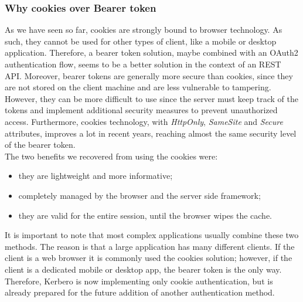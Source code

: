 \subsubsection{Why cookies over Bearer token}
As we have seen so far, cookies are strongly bound to browser technology. As such, they cannot be used for other types of client, like a mobile or desktop application. Therefore, a bearer token solution, maybe combined with an OAuth2 authentication flow, seems to be a better solution in the context of an REST API. 
Moreover, bearer tokens are generally more secure than cookies, since they are not stored on the client machine and are less vulnerable to tampering. However, they can be more difficult to use since the server must keep track of the tokens and implement additional security measures to prevent unauthorized access. Furthermore, cookies technology, with \textit{HttpOnly}, \textit{SameSite} and \textit{Secure} attributes, improves a lot in recent years, reaching almost the same security level of the bearer token.
\\ The two benefits we recovered from using the cookies were:
\begin{itemize}
    \item they are lightweight and more informative;
    \item completely managed by the browser and the server side framework;
    \item they are valid for the entire session, until the browser wipes the cache.
\end{itemize}
It is important to note that most complex applications usually combine these two methods. The reason is that a large application has many different clients. If the client is a web browser it is commonly used the cookies solution; however, if the client is a dedicated mobile or desktop app, the bearer token is the only way. Therefore, Kerbero is now implementing only cookie authentication, but is already prepared for the future addition of another authentication method.


